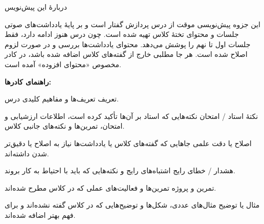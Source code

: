 \begingroup
\thispagestyle{empty}
{\titlefont\LARGE دربارهٔ این پیش‌نویس\par}
\vspace{1em}
این جزوه پیش‌نویسی موقت از درس پردازش گفتار است و بر پایهٔ یادداشت‌های صوتی جلسات و محتوای تختهٔ کلاس تهیه شده است. چون درس هنوز ادامه دارد، فقط جلسات اول تا نهم را پوشش می‌دهد. محتوای یادداشت‌ها بررسی و در صورت لزوم اصلاح شده است. هر جا مطلبی خارج از گفته‌های کلاس اضافه شده باشد، در کادر مخصوص «محتوای افزوده» آمده است.

\vspace{0.6em}
\textbf{راهنمای کادرها:}

\begin{definitionbox}{تعریف}
تعریف‌ها و مفاهیم کلیدی درس.
\end{definitionbox}
\begin{exambox}{نکتهٔ استاد / امتحان}
نکته‌هایی که استاد بر آن‌ها تأکید کرده است، اطلاعات ارزشیابی و امتحان، تمرین‌ها و نکته‌های جانبی کلاس.
\end{exambox}
\begin{correctionbox}{اصلاح یا دقت علمی}
جاهایی که گفته‌های کلاس یا یادداشت‌ها نیاز به اصلاح یا دقیق‌تر شدن داشته‌اند.
\end{correctionbox}
\begin{warningbox}{هشدار / خطای رایج}
اشتباه‌های رایج و نکته‌هایی که باید با احتیاط به کار بروند.
\end{warningbox}
\begin{assignmentbox}{تمرین و پروژه}
تمرین‌ها و فعالیت‌های عملی که در کلاس مطرح شده‌اند.
\end{assignmentbox}
\begin{addedbox}{مثال یا توضیح}
مثال‌های عددی، شکل‌ها و توضیح‌هایی که در کلاس گفته نشده‌اند و برای فهم بهتر اضافه شده‌اند.
\end{addedbox}
\clearpage
\endgroup
